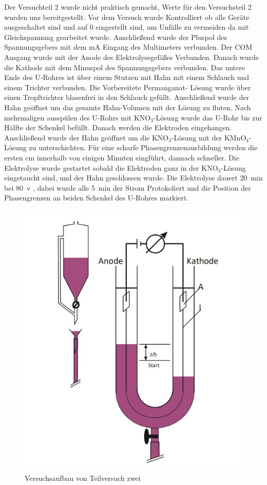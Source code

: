 Der Versuchteil 2 wurde nicht praktisch gemacht, Werte für den Versuchsteil 2 wurden uns bereitgestellt. 
Vor dem Versuch wurde Kontrolliert ob alle Geräte ausgeschaltet sind und auf 0 eingestellt sind, um Unfälle zu vermeiden da mit Gleichspannung gearbeitet wurde. Anschließend wurde der Pluspol des Spannungsgebers mit dem mA Eingang des Multimeters verbunden. Der COM Ausgang wurde mit der Anode des Elektrolysegefäßes Verbunden. Danach wurde die Kathode mit dem Minuspol des Spannungsgebers verbunden. Das untere Ende des U-Rohres ist über einem Stutzen mit Hahn mit einem Schlauch und einem Trichter verbunden. Die Vorbereitete Permanganat- Lösung wurde über einen Tropftrichter blasenfrei in den Schlauch gefüllt. Anschließend wurde der Hahn geöffnet um das gesamte Hahn-Volumen mit der Lösung zu fluten. Nach mehrmaligen ausspülen des U-Rohrs mit KNO$_{3}$-Lösung wurde das U-Rohr bis zur Hälfte der Schenkel befüllt. Danach werden die Elektroden eingehangen. Anschließend wurde der Hahn geöffnet um die KNO$_3$-Lösung mit der KMnO$_4$-Lösung zu unterschichten. Für eine scharfe Phasengrenzenausbildung werden die ersten cm innerhalb von einigen Minuten eingführt, dannach schneller. Die Elektrolyse wurde gestartet sobald die Elektroden ganz in der KNO$_3$-Lösung eingetaucht sind, und der Hahn geschlossen wurde. Die Elektrolyse dauert 20\ min bei 80\ v , dabei wurde alle 5\ min der Strom Protokoliert und die Position der Phasengrenzen an beiden Schenkel des U-Rohres markiert. 

\begin{figure}[H]
\centering
\includegraphics[scale=0.5]{Zweikammer.jpg}
\caption{Versuchsaufbau von Teilversuch zwei}
\end{figure}
